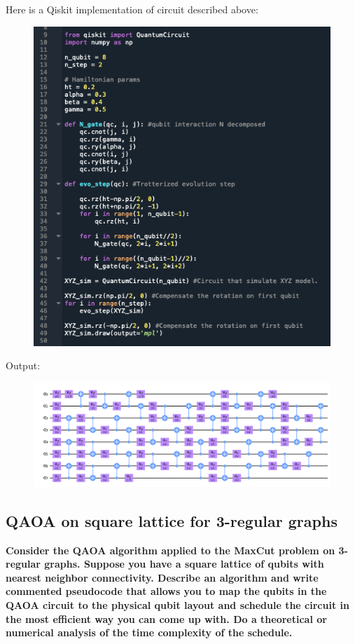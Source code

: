 \documentclass{article}
\begin{document}
\newpage
Here is a Qiskit implementation of circuit described above:
\begin{figure}[h]
    \centering
    \includegraphics[width=0.7\linewidth]{figt1-2.png}
\end{figure}


Output:
\begin{figure}[h]
    \centering
    \includegraphics[width=0.8\linewidth]{figt1-3.png}
\end{figure}

\newpage
\subsection{QAOA on square lattice for 3-regular graphs}

\textbf{Consider the QAOA algorithm applied to the MaxCut problem on 3-regular graphs. Suppose you have a square lattice of qubits with nearest neighbor connectivity. Describe an algorithm and write commented pseudocode that allows you to map the qubits in the QAOA circuit to the physical qubit layout and schedule the circuit in the most efficient way you can come up with. Do a theoretical or numerical analysis of the time complexity of the schedule.}\\
\end{document}
